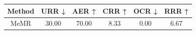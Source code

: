 \begin{tabular}{cccccc}
\hline
Method & URR ↓ & AER ↑ & CRR ↑ & OCR ↓ & RRR ↑ \\
\hline
MeMR & 30.00 & 70.00 & 8.33 & 0.00 & 6.67 \\
\hline
\end{tabular}
